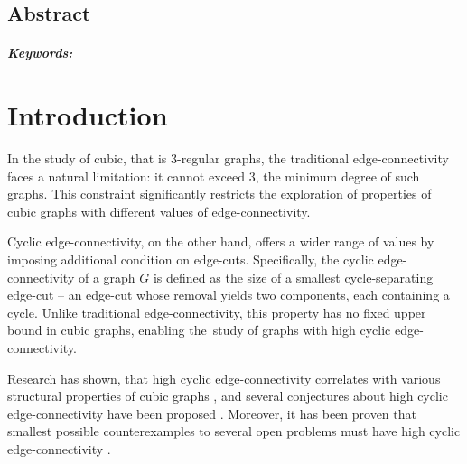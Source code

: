 \documentclass[12pt, twoside]{book}
\begin{document}
\newpage

\begin{otherlanguage}{USenglish}
    \section*{Abstract}

    \thesisabstracten{}

    \paragraph*{Keywords:} \thesiskeywordsen{}
\end{otherlanguage}

\newpage
\tableofcontents

\newpage
\listoffigures

\mainmatter{}

\chapter*{Introduction}

In the study of cubic, that is 3-regular graphs, the traditional edge-connectivity faces a natural limitation: it cannot exceed 3, the minimum degree of such graphs. This constraint significantly restricts the exploration of properties of cubic graphs with different values of edge-connectivity.

Cyclic edge-connectivity, on the other hand, offers a wider range of values by imposing additional condition on edge-cuts. Specifically, the cyclic edge-connectivity of a graph $G$ is defined as the size of a smallest cycle-separating edge-cut -- an edge-cut whose removal yields two components, each containing a cycle. Unlike traditional edge-connectivity, this property has no fixed upper bound in cubic graphs, enabling the~study of graphs with high cyclic edge-connectivity.

Research has shown, that high cyclic \mbox{edge-connectivity} correlates with various structural properties of cubic graphs \cite{Andersen1988, Doslic2003, McCuaig1992, Thomassen1983}, and several conjectures about high cyclic edge-connectivity have been proposed \cite{Fleischner1988, jaeger1980conjecture, Thomassen1986}. Moreover, it has been proven that smallest possible counterexamples to several open problems must have high cyclic edge-connectivity \cite{Kochol2004, Macajova2020}.
\end{document}
